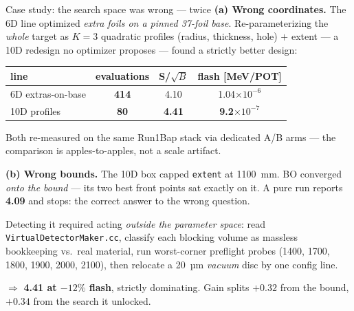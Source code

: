 \documentclass[aspectratio=169,10pt]{beamer}
\begin{document}
\begin{frame}{Case study: the search space was wrong --- twice}
\small
\textbf{(a) Wrong coordinates.} The 6D line optimized \emph{extra foils on a pinned
37-foil base}. Re-parameterizing the \emph{whole} target as $K{=}3$ quadratic profiles
(radius, thickness, hole) $+$ extent --- a 10D redesign no optimizer proposes ---
found a strictly better design:
\vspace{0.3em}
\begin{center}
\begin{tabular}{@{}lccc@{}}
\toprule
line & evaluations & S/$\sqrt{B}$ & flash [MeV/POT] \\
\midrule
6D extras-on-base   & \textbf{414} & 4.10 & 1.04$\times10^{-6}$ \\
10D profiles        & \textbf{80}  & \textbf{4.41} & \textbf{9.2$\times10^{-7}$} \\
\bottomrule
\end{tabular}
\end{center}
\vspace{0.2em}
{\scriptsize Both re-measured on the same Run1Bap stack via dedicated A/B arms --- the
comparison is apples-to-apples, not a scale artifact.}
\vspace{0.8em}

\textbf{(b) Wrong bounds.} The 10D box capped \texttt{extent} at 1100~mm. BO converged
\emph{onto the bound} --- its two best front points sat exactly on it. A pure run
reports \textbf{4.09} and stops: the correct answer to the wrong question.
\vspace{0.3em}

Detecting it required acting \emph{outside the parameter space}: read
\texttt{VirtualDetectorMaker.cc}, classify each blocking volume as massless
bookkeeping vs.\ real material, run worst-corner preflight probes
(1400, 1700, 1800, 1900, 2000, 2100), then relocate a 20~µm \emph{vacuum} disc by one
config line.
\vspace{0.3em}

$\Rightarrow$ \textbf{4.41 at $-12\%$ flash}, strictly dominating. Gain splits
$+0.32$ from the bound, $+0.34$ from the search it unlocked.
\end{frame}
\end{document}
